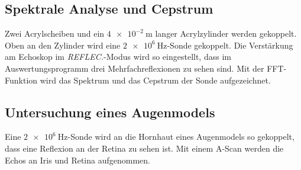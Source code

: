 \subsection{Spektrale Analyse und Cepstrum}
Zwei Acrylscheiben und ein $\SI{4e-2}{\metre}$ langer Acrylzylinder werden gekoppelt. Oben an den Zylinder wird eine $\SI{2e6}{\hertz}$-Sonde gekoppelt.
Die Verstärkung am Echoskop im \textit{REFLEC.}-Modus wird so eingestellt, dass im Auswertungsprogramm drei Mehrfachreflexionen zu sehen sind. Mit der FFT-Funktion wird das Spektrum und das Cepstrum der Sonde aufgezeichnet.

\subsection{Untersuchung eines Augenmodels}
Eine $\SI{2e6}{\hertz}$-Sonde wird an die Hornhaut eines Augenmodels so gekoppelt, dass eine Reflexion an der Retina zu sehen ist. Mit einem A-Scan werden die Echos an Iris und Retina aufgenommen.